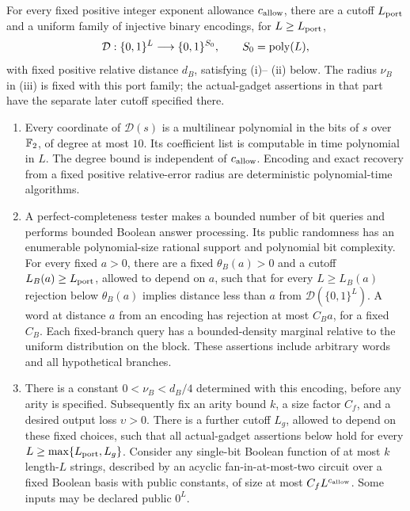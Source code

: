 \begin{theorem}\label{thm:port-gadget}
For every fixed positive integer exponent allowance $c_{\rm allow}$, there
are a cutoff $L_{\rm port}$ and a uniform family of injective binary
encodings, for $L\geq L_{\rm port}$,
\[
 \mathcal D:\{0,1\}^{L}\longrightarrow\{0,1\}^{S_0},
 \qquad S_0=\operatorname{poly}(L),
\]
with fixed positive relative distance $d_B$, satisfying \textup{(i)}--
\textup{(ii)} below. The radius $\nu_B$ in \textup{(iii)} is fixed with
this port family; the actual-gadget assertions in that part have the
separate later cutoff specified there.
\begin{enumerate}[label=\textup{(\roman*)}]
\item Every coordinate of $\mathcal D(s)$ is a multilinear polynomial in
the bits of $s$ over $\mathbb{F}_2$, of degree at most $10$. Its coefficient list
is computable in time polynomial in $L$. The degree bound is independent
of $c_{\rm allow}$. Encoding and exact recovery from a fixed positive
relative-error radius are deterministic polynomial-time algorithms.
\item A perfect-completeness tester makes a bounded number of bit queries
and performs bounded Boolean answer processing. Its public randomness has
an enumerable polynomial-size rational support and polynomial bit
complexity. For every fixed $a>0$, there are a fixed $\theta_B(a)>0$
and a cutoff $L_B(a)\geq L_{\rm port}$, allowed to depend on $a$, such
that for every $L\geq L_B(a)$ rejection below $\theta_B(a)$ implies
distance less than $a$ from $\mathcal D(\{0,1\}^L)$.
A word at distance $a$ from an encoding has
rejection at most $C_Ba$, for a fixed $C_B$. Each fixed-branch query has a
bounded-density marginal relative to the uniform distribution on the
block. These assertions include arbitrary words and all hypothetical
branches.
\item There is a constant $0<\nu_B<d_B/4$ determined with this encoding,
before any arity is specified. Subsequently fix an arity bound $k$, a
size factor $C_f$, and a desired output loss $\upsilon>0$. There is a
further cutoff $L_g$, allowed to depend on these fixed choices, such that
all actual-gadget assertions below hold for every
$L\geq\max\{L_{\rm port},L_g\}$. Consider any single-bit Boolean
function of at most $k$ length-$L$ strings, described
by an acyclic fan-in-at-most-two circuit over a fixed Boolean basis with
public constants, of size at most $C_f L^{c_{\rm allow}}$. Some inputs
may be declared public $0^L$.


\end{enumerate}
\end{theorem}
